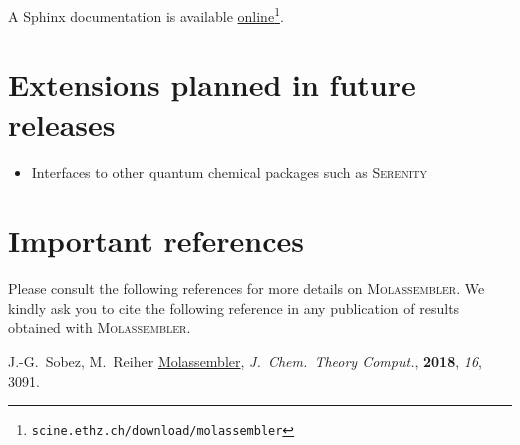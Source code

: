\documentclass[]{tufte-book}
\begin{document}
A Sphinx documentation is available 
\href{https://scine.ethz.ch/download/molassembler}{online}\footnote{\texttt{scine.ethz.ch/download/molassembler}}.

\chapter{Extensions planned in future releases}
\begin{itemize}
\item Interfaces to other quantum chemical packages such as \textsc{Serenity}\cite{serenity}
\end{itemize}


\chapter{Important references}

Please consult the following references for more details on
\textsc{Molassembler}. We kindly ask you to cite the following reference in any
publication of results obtained with \textsc{Molassembler}.
\vspace{1.0cm}

J.-G.~Sobez, M.~Reiher
\href{https://pubs.acs.org/doi/10.1021/acs.jctc.8b00169}{Molassembler}, \textit{J.~Chem.~Theory Comput.}, \textbf{2018}, \textit{16}, 3091.




\backmatter




\end{document}
